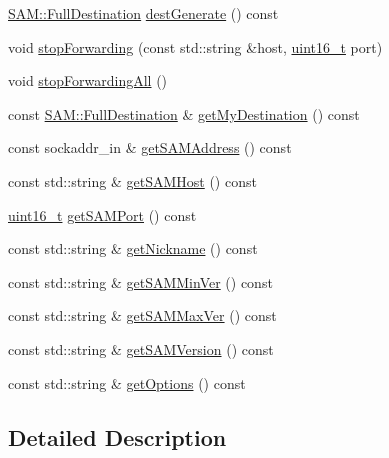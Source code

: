 \begin{DoxyCompactItemize}
\item 
\hyperlink{struct_s_a_m_1_1_full_destination}{S\+A\+M\+::\+Full\+Destination} \hyperlink{class_s_a_m_1_1_stream_session_adapter_a62c02a359e9e36459f13180189bed974}{dest\+Generate} () const 
\item 
void \hyperlink{class_s_a_m_1_1_stream_session_adapter_a0c0e5dec8a7ec68aeae7a653e6aa8d13}{stop\+Forwarding} (const std\+::string \&host, \hyperlink{stdint_8h_a273cf69d639a59973b6019625df33e30}{uint16\+\_\+t} port)
\item 
void \hyperlink{class_s_a_m_1_1_stream_session_adapter_a94cb431a3fee60c87f134b1b925ff67a}{stop\+Forwarding\+All} ()
\item 
const \hyperlink{struct_s_a_m_1_1_full_destination}{S\+A\+M\+::\+Full\+Destination} \& \hyperlink{class_s_a_m_1_1_stream_session_adapter_a80d5e268298b1970dbb1119df2bc76d5}{get\+My\+Destination} () const 
\item 
const sockaddr\+\_\+in \& \hyperlink{class_s_a_m_1_1_stream_session_adapter_a3507ca50cf27d61adaad5ac5006172df}{get\+S\+A\+M\+Address} () const 
\item 
const std\+::string \& \hyperlink{class_s_a_m_1_1_stream_session_adapter_a154db264cc3b2c442c11280175ae7e8d}{get\+S\+A\+M\+Host} () const 
\item 
\hyperlink{stdint_8h_a273cf69d639a59973b6019625df33e30}{uint16\+\_\+t} \hyperlink{class_s_a_m_1_1_stream_session_adapter_aceada2034be63523f41ac1153c2dc3fa}{get\+S\+A\+M\+Port} () const 
\item 
const std\+::string \& \hyperlink{class_s_a_m_1_1_stream_session_adapter_a928ff5f1c5546862fedd2f4216e56541}{get\+Nickname} () const 
\item 
const std\+::string \& \hyperlink{class_s_a_m_1_1_stream_session_adapter_ab194deeaa1fba6e8eed3e55af17d788c}{get\+S\+A\+M\+Min\+Ver} () const 
\item 
const std\+::string \& \hyperlink{class_s_a_m_1_1_stream_session_adapter_ac9a713a36d06047b54d1a5df477165be}{get\+S\+A\+M\+Max\+Ver} () const 
\item 
const std\+::string \& \hyperlink{class_s_a_m_1_1_stream_session_adapter_af0911ea5109eb8e0987b328369e80dc2}{get\+S\+A\+M\+Version} () const 
\item 
const std\+::string \& \hyperlink{class_s_a_m_1_1_stream_session_adapter_adc4e097ce8db41980c540e6c11371585}{get\+Options} () const 
\end{DoxyCompactItemize}


\subsection{Detailed Description}


